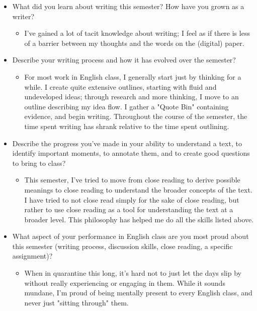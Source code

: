 \documentclass[letterpaper]{article}
\begin{document}
\begin{itemize}
\item What did you learn about writing this semester? How have you grown as
a writer?

\begin{itemize}
\item I've gained a lot of tacit knowledge about writing; I feel as if
there is less of a barrier between my thoughts and the words on the
(digital) paper.
\end{itemize}

\item Describe your writing process and how it has evolved over the
semester?

\begin{itemize}
\item For most work in English class, I generally start just by thinking
for a while. I create quite extensive outlines, starting with fluid
and undeveloped ideas; through research and more thinking, I move to
an outline describing my idea flow. I gather a "Quote Bin"
containing evidence, and begin writing. Throughout the course of the
semester, the time spent writing has shrank relative to the time
spent outlining.
\end{itemize}

\item Describe the progress you've made in your ability to understand a
text, to identify important moments, to annotate them, and to create
good questions to bring to class?

\begin{itemize}
\item This semester, I've tried to move from close reading to derive
possible meanings to close reading to understand the broader
concepts of the text. I have tried to not close read simply for the
sake of close reading, but rather to use close reading as a tool for
understanding the text at a broader level. This philosophy has
helped me do all the skills listed above.
\end{itemize}

\item What aspect of your performance in English class are you most proud
about this semester (writing process, discussion skills, close
reading, a specific assignment)?

\begin{itemize}
\item When in quarantine this long, it's hard not to just let the days
slip by without really experiencing or engaging in them. While it
sounds mundane, I'm proud of being mentally present to every English
class, and never just "sitting through" them.
\end{itemize}


\end{itemize}
\end{document}
